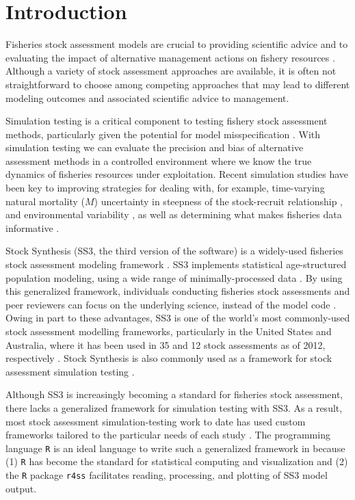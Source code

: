 \documentclass[11pt]{article}
\begin{document}

\section*{Introduction}

Fisheries stock assessment models are crucial to providing scientific advice and to evaluating the impact of alternative management actions on fishery resources \cite{gulland1983, hilborn1992}. Although a variety of stock assessment approaches are available, it is often not straightforward to choose among competing approaches that may lead to different modeling outcomes and associated scientific advice to management.

Simulation testing is a critical component to testing fishery stock assessment methods, particularly given the potential for model misspecification \cite{hilborn1987, hilborn1992, rosenberg1994, peterman2004, deroba2013a}. With simulation testing we can evaluate the precision and bias of alternative assessment methods in a controlled environment where we know the true dynamics of fisheries resources under exploitation. Recent simulation studies have been key to improving strategies for dealing with, for example, time-varying natural mortality ($M$) \cite{lee2011, jiao2012, deroba2013, johnson2013} uncertainty in steepness of the stock-recruit relationship \cite{lee2012}, and environmental variability \cite{schirripa2009}, as well as determining what makes fisheries data informative \cite{magnusson2007, wetzel2011a, ono2013, yin2004}.

Stock Synthesis (SS3, the third version of the software) is a widely-used fisheries stock assessment modeling framework \cite{methot2013}. SS3 implements statistical age-structured population modeling, using a wide range of minimally-processed data \cite{maunder2013, methot2013}. By using this generalized framework, individuals conducting fisheries stock assessments and peer reviewers can focus on the underlying science, instead of the model code \cite{methot2013}. Owing in part to these advantages, SS3 is one of the world's most commonly-used stock assessment modelling frameworks, particularly in the United States and Australia, where it has been used in 35 and 12 stock assessments as of 2012, respectively \cite{methot2013}. Stock Synthesis is also commonly used as a framework for stock assessment simulation testing \cite{helu2000, yin2004, schirripa2009, lee2011, jiao2012, lee2012, crone2013a, hurtadoferro2013}.

Although SS3 is increasingly becoming a standard for fisheries stock assessment, there lacks a generalized framework for simulation testing with SS3. As a result, most stock assessment simulation-testing work to date has used custom frameworks tailored to the particular needs of each study \cite{helu2000, yin2004, magnusson2007, wetzel2011a, jiao2012, wilberg2006, deroba2013a, deroba2013, crone2013a, hurtadoferro2013}. The programming language \texttt{R} \cite{rcoreteam2013} is an ideal language to write such a generalized framework in because (1) \texttt{R} has become the standard for statistical computing and visualization and (2) the \texttt{R} package \texttt{r4ss} \cite{r4ss2013} facilitates reading, processing, and plotting of SS3 model output.
\end{document}
